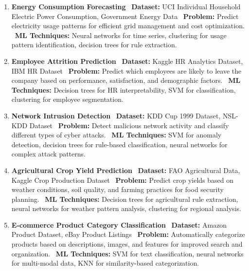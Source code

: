 \documentclass{article}
\begin{document}
\begin{enumerate}
\item \textbf{Energy Consumption Forecasting} \
\textbf{Dataset:} UCI Individual Household Electric Power Consumption, Government Energy Data \
\textbf{Problem:} Predict electricity usage patterns for efficient grid management and cost optimization. \
\textbf{ML Techniques:} Neural networks for time series, clustering for usage pattern identification, decision trees for rule extraction.

\item \textbf{Employee Attrition Prediction} \
\textbf{Dataset:} Kaggle HR Analytics Dataset, IBM HR Dataset \
\textbf{Problem:} Predict which employees are likely to leave the company based on performance, satisfaction, and demographic factors. \
\textbf{ML Techniques:} Decision trees for HR interpretability, SVM for classification, clustering for employee segmentation.

\item \textbf{Network Intrusion Detection} \
\textbf{Dataset:} KDD Cup 1999 Dataset, NSL-KDD Dataset \
\textbf{Problem:} Detect malicious network activity and classify different types of cyber attacks. \
\textbf{ML Techniques:} SVM for anomaly detection, decision trees for rule-based classification, neural networks for complex attack patterns.

\item \textbf{Agricultural Crop Yield Prediction} \
\textbf{Dataset:} FAO Agricultural Data, Kaggle Crop Production Dataset \
\textbf{Problem:} Predict crop yields based on weather conditions, soil quality, and farming practices for food security planning. \
\textbf{ML Techniques:} Decision trees for agricultural rule extraction, neural networks for weather pattern analysis, clustering for regional analysis.

\item \textbf{E-commerce Product Category Classification} \
\textbf{Dataset:} Amazon Product Dataset, eBay Product Listings \
\textbf{Problem:} Automatically categorize products based on descriptions, images, and features for improved search and organization. \
\textbf{ML Techniques:} SVM for text classification, neural networks for multi-modal data, KNN for similarity-based categorization.

\end{enumerate}
\end{document}
